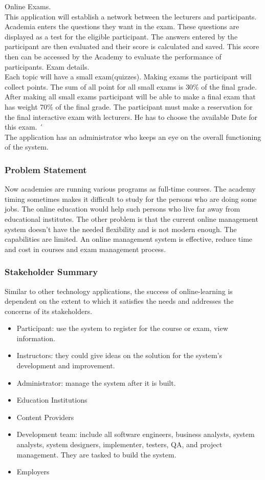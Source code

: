 \documentclass{scrartcl}
\begin{document}
Online Exams.\\
 This application will establish a network between the lecturers and participants. Academia enters the questions they want in the exam. These questions are displayed as a test for the eligible participant. The answers entered by the participant are then evaluated and their score is calculated and saved. This score then can be accessed by the Academy to evaluate the performance of participants.
Exam details.\\
Each topic will have a small exam(quizzes). Making exams the participant will collect points. The sum of all point for all small exams is 30\% of the final grade. After making all small exams participant will be able to make a final exam that has weight 70\% of the final grade. The participant must make a reservation for the final interactive exam with lecturers. He has to choose the available Date for this exam. ´\\

The application has an administrator who keeps an eye on the overall functioning of the system.

  	
  	\subsubsection{Problem Statement}
  	Now academies are running various programs as full-time courses. The academy timing sometimes makes it difficult to study for the persons who are doing some jobs. The online education would help such persons who live far away from educational institutes.
The other problem is that the current online management system doesn't have the needed flexibility and is not modern enough. The capabilities are limited.
An online management system is effective, reduce time and cost in courses and exam management process.

  	\subsubsection{Stakeholder Summary}
  	Similar to other technology applications, the success of online-learning is dependent on the extent to which it satisfies the needs and addresses the concerns of its stakeholders.
  	\begin{itemize}
  	\item Participant: use the system to register for the course or exam, view 			information.
  	\item Instructors: they could give ideas on the solution for the system’s development and improvement.
  	\item Administrator: manage the system after it is built.
  	\item Education Institutions 
  	\item Content Providers
  	\item Development team: include all software engineers, business analysts, system analysts, system designers, implementer, testers, QA, and project management. They are tasked to build the system.
  	\item Employers
  	\end{itemize}
  	
\end{document}
